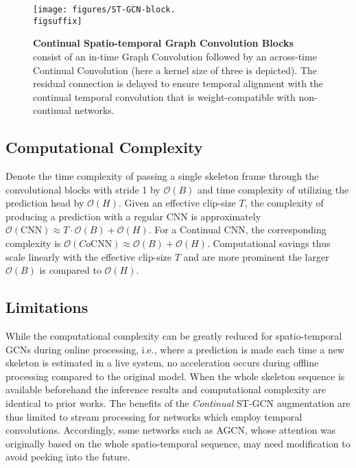 \documentclass[journal]{IEEEtran}
\newcommand{\figsuffix}{png}
\theoremstyle{definition}
\begin{document}
\begin{figure}[tb]
    \centering
    \texttt{[image: figures/ST-GCN-block.\\figsuffix]}
    \caption{\textbf{Continual Spatio-temporal Graph Convolution Blocks} consist of an in-time Graph Convolution followed by an across-time Continual Convolution (here a kernel size of three is depicted). The residual connection is delayed to ensure temporal alignment with the continual temporal convolution that is weight-compatible with non-continual networks. }
    \label{fig:co-st-gcn-block}
\end{figure}

\subsection{Computational Complexity} \label{sec:complexity}
Denote the time complexity of passing a single skeleton frame through the convolutional blocks with stride 1 by $\mathcal{O}(B)$ and time complexity of utilizing the prediction head by $\mathcal{O}(H)$.
Given an effective clip-size $T$, the complexity of producing a prediction with a regular CNN is approximately $\mathcal{O}(\text{CNN}) \approx T\cdot \mathcal{O}(B) + \mathcal{O}(H)$.
For a Continual CNN, the corresponding complexity is $\mathcal{O}(Co\text{CNN}) \approx \mathcal{O}(B) + \mathcal{O}(H)$. 
Computational savings thus scale linearly with the effective clip-size $T$ and are more prominent the larger $\mathcal{O}(B)$ is compared to $\mathcal{O}(H)$.


\subsection{Limitations}
{
While the computational complexity can be greatly reduced for spatio-temporal GCNs during online processing, i.e., where a prediction is made each time a new skeleton is estimated in a live system, no acceleration occurs during offline processing compared to the original model. When the whole skeleton sequence is available beforehand the inference results and computational complexity are identical to prior works. The benefits of the \textit{Continual} ST-GCN augmentation are thus limited to stream processing for networks which employ temporal convolutions. Accordingly, some networks such as AGCN, whose attention was originally based on the whole spatio-temporal sequence, may need modification to avoid peeking into the future.}
\end{document}
